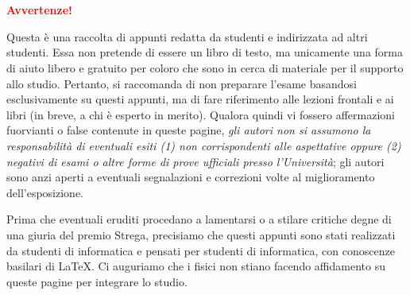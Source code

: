 \chapter*{}

\vspace*{0.2\paperheight}
\begin{center}
    \textcolor{red}{\textbf{\Huge Avvertenze!}}\\
    \begin{center}
    
    \end{center}
    Questa è una raccolta di appunti redatta da studenti e indirizzata
    ad altri studenti. Essa non pretende di essere un libro
    di testo, ma unicamente una forma di aiuto libero e gratuito per coloro
    che sono in cerca di materiale per il supporto allo studio.
    Pertanto, si raccomanda di non preparare l'esame basandosi esclusivamente
    su questi appunti, ma di fare riferimento alle lezioni frontali
    e ai libri (in breve, a chi è esperto in merito). Qualora quindi
    vi fossero affermazioni fuorvianti o false contenute in queste
    pagine, \textit{gli autori non si assumono la responsabilità di eventuali
    esiti (1) non corrispondenti alle aspettative oppure (2) negativi di esami
    o altre forme di prove ufficiali presso l'Università}; gli autori sono anzi
    aperti a eventuali segnalazioni e correzioni volte al miglioramento
    dell'esposizione.

    Prima che eventuali eruditi procedano a lamentarsi o
    a stilare critiche degne di una giuria del premio
    Strega, precisiamo che questi appunti sono stati realizzati
    da studenti di informatica e pensati per studenti di informatica,
    con conoscenze basilari di \LaTeX.
    Ci auguriamo che i fisici non stiano facendo affidamento su
    queste pagine per integrare lo studio.
\end{center}